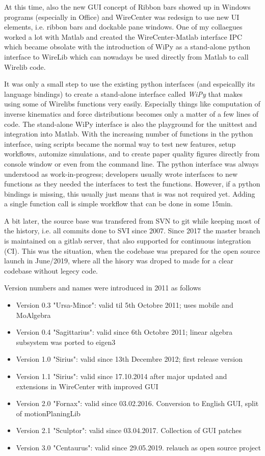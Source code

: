\documentclass[11pt,a4paper,onepage,openany]{book}
\begin{document}
At this time, also the new GUI concept of Ribbon bars showed up in Windows programs (especially in 
Office) and WireCenter was redesign to use new UI elements, i.e. ribbon bars and dockable pane windows.
One of my collaegues worked a lot with Matlab and created the WireCenter-Matlab interface IPC which 
became obsolate with the introduction of WiPy as a stand-alone python interface to WireLib which can 
nowadays be used directly from Matlab to call Wirelib code.

It was only a small step to use the existing python interfaces (and espeicallly its language bindings) 
to create a stand-alone interface called \emph{WiPy} that makes using some of Wirelibs functions very
easily. Especially things like computation of inverse kinematics and force distributions becomes only 
a matter of a few lines of code. The stand-alone WiPy interface is also the playground for the unittest
and integration into Matlab. With the increasing number of functions in the python interface, using
scripts became the normal way to test new features, setup workflows, automize simulations, and to
create paper quality figures directly from console window or even from the command line. The python 
interface was always understood as work-in-progress; developers usually wrote interfaces to new functions
as they needed the interfaces to test the functions. However, if a python bindings is missing, this usually 
just means that is was not required yet. Adding a single function call is simple workflow that can be 
done in some 15min. 

A bit later, the source base was transfered from SVN to git while keeping most of the history, i.e. all 
commits done to SVI since 2007. Since 2017 the master branch is maintained on a gitlab server, that also 
supported for continuous integration (CI). This was the situation, when the codebase was prepared for 
the open source launch in June/2019, where all the hisory was droped to made for a clear codebase without 
legecy code.

Version numbers and names were introduced in 2011 as follows
\begin{itemize}
\item Version 0.3 "Ursa-Minor": valid til 5th Octobre 2011; uses mobile and MoAlgebra
\item Version 0.4 "Sagittarius": valid since 6th Octobre 2011; linear algebra subsystem was ported to eigen3
\item Version 1.0 "Sirius": valid since 13th Decembre 2012; first release version
\item Version 1.1 "Sirius": valid since 17.10.2014 after major updated and extensions in WireCenter with improved GUI
\item Version 2.0 "Fornax": valid since 03.02.2016. Conversion to English GUI, split of motionPlaningLib  
\item Version 2.1 "Sculptor": valid since 03.04.2017. Collection of GUI patches
\item Version 3.0 "Centaurus": valid since 29.05.2019. relauch as open source project
\end{itemize}
\end{document}
